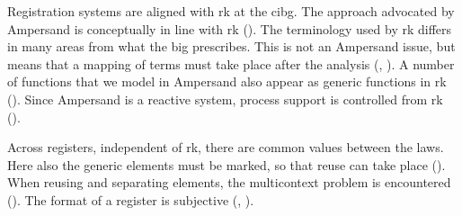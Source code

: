 Registration systems are aligned with \acrshort{rk} at the \acrshort{cibg}.
The approach advocated by Ampersand is conceptually in line with \acrshort{rk} ().
The terminology used by \acrshort{rk} differs in many areas from what the \acrshort{big} prescribes.
This is not an Ampersand issue, but means that a mapping of terms must take place after the analysis (, ).
A number of functions that we model in Ampersand also appear as generic functions in \acrshort{rk} ().
Since Ampersand is a reactive system, process support is controlled from \acrshort{rk} ().
\label{s:5_2_demarcation}

Across registers, independent of \acrshort{rk}, there are common values between the laws.
Here also the generic elements must be marked, so that reuse can take place ().
When reusing and separating elements, the multicontext problem is encountered ().
The format of a register is subjective (, ).


